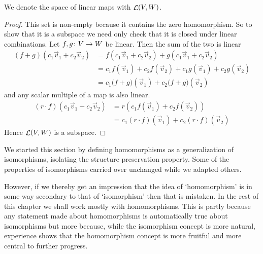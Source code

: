 \noindent We denote the space of linear maps with
\( \mathop{{\cal L}}(V,W) \).

\begin{proof}
This set is non-empty because it contains the zero homomorphism.
So to show that it is a subspace we need only check that it is 
closed under linear combinations.
Let \( \mbox{$f,g\colon V\to W$} \) be linear. 
Then the sum of the two is linear
\begin{align*}
   (f+g)(c_1\vec{v}_1+c_2\vec{v}_2)
   &=f(c_1\vec{v}_1+c_2\vec{v}_2) + 
   g(c_1\vec{v}_1+c_2\vec{v}_2)       \\
   &=c_1f(\vec{v}_1)+c_2f(\vec{v}_2)
   +c_1g(\vec{v}_1)+c_2g(\vec{v}_2)   \\
   &=c_1\bigl(f+g\bigr)(\vec{v}_1)+c_2\bigl(f+g\bigr)(\vec{v}_2)
\end{align*}
and any scalar multiple of a map is also linear.
\begin{align*}
   (r\cdot f)(c_1\vec{v}_1+c_2\vec{v}_2)
   &=r(c_1f(\vec{v}_1)+c_2f(\vec{v}_2))  \\
   &=c_1(r\cdot f)(\vec{v}_1)+c_2(r\cdot f)(\vec{v}_2)
\end{align*}
Hence \( \mathop{{\cal L}}(V,W) \) is a subspace.
\end{proof}

We started this section by 
defining homomorphisms as a generalization of isomorphisms,
isolating the structure preservation property.
Some of the properties of isomorphisms carried over unchanged
while we adapted others.

However, if we thereby get an impression that 
the idea of 
`homomorphism' is in some way secondary to
that of `isomorphism' then that is mistaken.
In the rest of this chapter we shall work mostly with homomorphisms.
This is
partly because any statement made about homomorphisms is automatically true 
about isomorphisms but more because, 
while the isomorphism concept is more natural, 
experience shows that the homomorphism concept 
is more fruitful and more central to further progress.

